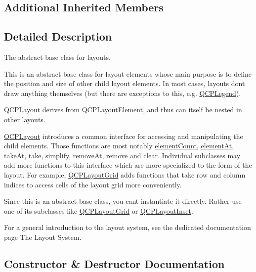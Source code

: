 \subsection*{Additional Inherited Members}


\subsection{Detailed Description}
The abstract base class for layouts. 

This is an abstract base class for layout elements whose main purpose is to define the position and size of other child layout elements. In most cases, layouts don\textquotesingle{}t draw anything themselves (but there are exceptions to this, e.\+g. \hyperlink{classQCPLegend}{Q\+C\+P\+Legend}).

\hyperlink{classQCPLayout}{Q\+C\+P\+Layout} derives from \hyperlink{classQCPLayoutElement}{Q\+C\+P\+Layout\+Element}, and thus can itself be nested in other layouts.

\hyperlink{classQCPLayout}{Q\+C\+P\+Layout} introduces a common interface for accessing and manipulating the child elements. Those functions are most notably \hyperlink{classQCPLayout_a39d3e9ef5d9b82ab1885ba1cb9597e56}{element\+Count}, \hyperlink{classQCPLayout_afa73ca7d859f8a3ee5c73c9b353d2a56}{element\+At}, \hyperlink{classQCPLayout_a5a79621fa0a6eabb8b520cfc04fb601a}{take\+At}, \hyperlink{classQCPLayout_ada26cd17e56472b0b4d7fbbc96873e4c}{take}, \hyperlink{classQCPLayout_a41e6ac049143866e8f8b4964efab01b2}{simplify}, \hyperlink{classQCPLayout_a2403f684fee3ce47132faaeed00bb066}{remove\+At}, \hyperlink{classQCPLayout_a6c58f537d8086f352576ab7c5b15d0bc}{remove} and \hyperlink{classQCPLayout_a02883bdf2769b5b227f0232dba1ac4ee}{clear}. Individual subclasses may add more functions to this interface which are more specialized to the form of the layout. For example, \hyperlink{classQCPLayoutGrid}{Q\+C\+P\+Layout\+Grid} adds functions that take row and column indices to access cells of the layout grid more conveniently.

Since this is an abstract base class, you can\textquotesingle{}t instantiate it directly. Rather use one of its subclasses like \hyperlink{classQCPLayoutGrid}{Q\+C\+P\+Layout\+Grid} or \hyperlink{classQCPLayoutInset}{Q\+C\+P\+Layout\+Inset}.

For a general introduction to the layout system, see the dedicated documentation page The Layout System. 

\subsection{Constructor \& Destructor Documentation}
\mbox{\label{classQCPLayout_a04222e6e1361fd802d48f1a25b7020d4}} 
